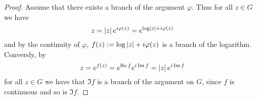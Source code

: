 \begin{enumerate}[label = \textbf{Exercise \arabic*.},wide = 0pt, itemsep=1.5ex]
	\begin{proof}
		Assume that there exists a branch of the argument $\varphi$. Thus for all $z \in G$ we have
		\begin{equation*}
			z = \abs[0]{z}e^{i \varphi(z)} = e^{\log\abs[0]{z} + i \varphi(z)}
		\end{equation*}
	\noindent and by the continuity of $\varphi$, $f(z) := \log\abs[0]{z} + i \varphi(z)$ is a branch of the logarithm. Conversly, by
	\begin{equation*}
		z = e^{f(z)} = e^{\Re f}e^{i \Im f} = \abs[0]{z} e^{i\Im f}
	\end{equation*}
	\noindent for all $z \in G$ we have that $\Im f$ is a branch of the argument on $G$, since $f$ is continuous and so is $\Im f$.
	\end{proof}
\end{enumerate}
\printbibliography


